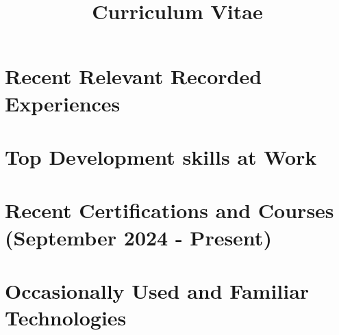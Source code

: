\documentclass[13.12pt,a4paper,sans,colorlinks,urlcolor=violet, hyperindex,plainpages=false,bookmarksopen,bookmarksnumbered,pdfusetitle]{moderncv}
\title{Curriculum Vitae}
\begin{document}
\hypersetup{urlcolor=violet}

\makecvtitle
\vspace{-3em}



\vspace{-1em}

\section{Recent Relevant Recorded Experiences}


\vspace{0.5em}



\section{Top Development skills at \textbf{Work}}


\section{Recent Certifications and Courses (September 2024 - Present)}


\section{Occasionally Used and Familiar Technologies}

\end{document}
